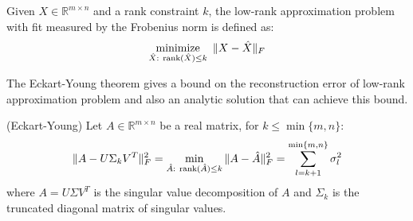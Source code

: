 \documentclass[../book-template.tex]{subfiles}
\begin{document}
\begin{definition}
Given $X\in \mathbb{R}^{m\times n}$ and a rank constraint $k$, the low-rank approximation problem with fit measured by the Frobenius norm is defined as:
\begin{equation*}
    \mathop{{\rm minimize}}_{\hat{X}:\ \rank(\hat{X})\leq k}\ \|X-\hat{X}\|_F
\end{equation*}
\end{definition}
\par The Eckart-Young theorem gives a bound on the reconstruction error of low-rank approximation problem and also an analytic solution that can achieve this bound.
\begin{theorem}\label{thm_1_EY}
(Eckart-Young) Let $A\in \mathbb{R}^{m\times n}$ be a real matrix, for $k\leq \min\{m,n\}$:
\begin{equation*}
    \|A-U\Sigma_kV^T\|_F^2 = \min_{\hat{A}:\ \rank(\hat{A})\leq k}\|A-\hat{A}\|^2_F = \sum_{l=k+1}^{\min\{m,n\}}\sigma_l^2 
\end{equation*}
where $A=U\Sigma V^T$ is the singular value decomposition of $A$ and $\Sigma_k$ is the truncated diagonal matrix of singular values.
\end{theorem}
\end{document}
